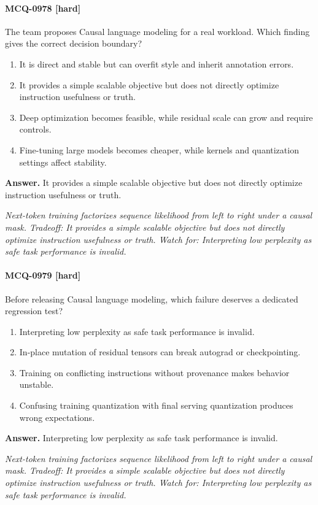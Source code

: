 \paragraph{MCQ-0978 [hard]} The team proposes Causal language modeling for a real workload. Which finding gives the correct decision boundary?
\begin{enumerate}[label=\Alph*.]
\item It is direct and stable but can overfit style and inherit annotation errors.
\item It provides a simple scalable objective but does not directly optimize instruction usefulness or truth.
\item Deep optimization becomes feasible, while residual scale can grow and require controls.
\item Fine-tuning large models becomes cheaper, while kernels and quantization settings affect stability.
\end{enumerate}
\noindent\textbf{Answer.} It provides a simple scalable objective but does not directly optimize instruction usefulness or truth.
\par\textit{Next-token training factorizes sequence likelihood from left to right under a causal mask. Tradeoff: It provides a simple scalable objective but does not directly optimize instruction usefulness or truth. Watch for: Interpreting low perplexity as safe task performance is invalid.}
\paragraph{MCQ-0979 [hard]} Before releasing Causal language modeling, which failure deserves a dedicated regression test?
\begin{enumerate}[label=\Alph*.]
\item Interpreting low perplexity as safe task performance is invalid.
\item In-place mutation of residual tensors can break autograd or checkpointing.
\item Training on conflicting instructions without provenance makes behavior unstable.
\item Confusing training quantization with final serving quantization produces wrong expectations.
\end{enumerate}
\noindent\textbf{Answer.} Interpreting low perplexity as safe task performance is invalid.
\par\textit{Next-token training factorizes sequence likelihood from left to right under a causal mask. Tradeoff: It provides a simple scalable objective but does not directly optimize instruction usefulness or truth. Watch for: Interpreting low perplexity as safe task performance is invalid.}
